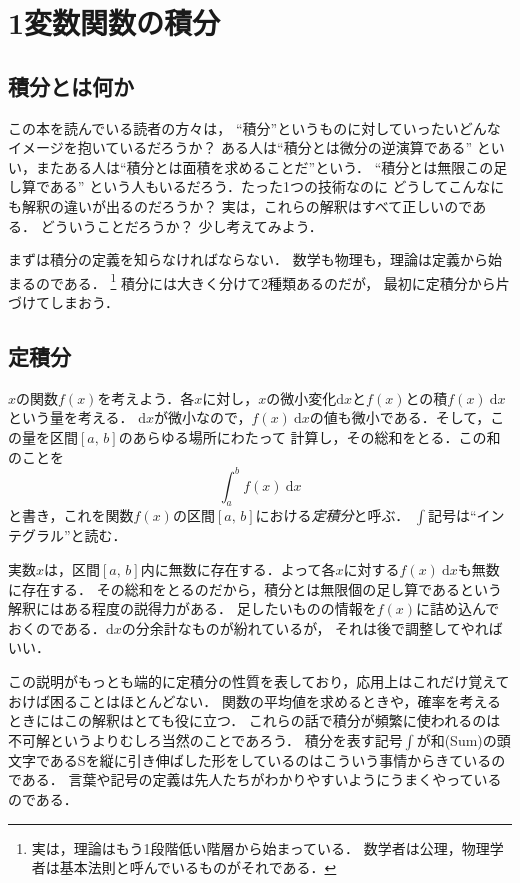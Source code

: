 \section{1変数関数の積分}
\subsection{積分とは何か}
この本を読んでいる読者の方々は，
``積分''というものに対していったいどんなイメージを抱いているだろうか？ ある人は``積分とは微分の逆演算である''
といい，またある人は``積分とは面積を求めることだ''という．
``積分とは無限この足し算である''
という人もいるだろう．たった1つの技術なのに
どうしてこんなにも解釈の違いが出るのだろうか？ 実は，これらの解釈はすべて正しいのである．
どういうことだろうか？ 少し考えてみよう．

まずは積分の定義を知らなければならない．
数学も物理も，理論は定義から始まるのである．
\footnote{実は，理論はもう1段階低い階層から始まっている．
数学者は公理，物理学者は基本法則と呼んでいるものがそれである．}
積分には大きく分けて2種類あるのだが，
最初に定積分から片づけてしまおう．

\subsection{定積分}
$x$の関数$f(x)$を考えよう．各$x$に対し，$x$の微小変化$\mathrm{d}x$と$f(x)$との積$f(x) \: \mathrm{d}x$という量を考える．
$\mathrm{d}x$が微小なので，$f(x) \: \mathrm{d}x$の値も微小である．そして，この量を区間$[a, \, b]$のあらゆる場所にわたって
計算し，その総和をとる．この和のことを
$$
\int_a^b f(x) \: \mathrm{d}x
$$
と書き，これを関数$f(x)$の区間$[a, \, b]$における\emph{定積分}と呼ぶ．
$\int$記号は``インテグラル''と読む．

実数$x$は，区間$[a, \, b]$内に無数に存在する．よって各$x$に対する$f(x) \: \mathrm{d}x$も無数に存在する．
その総和をとるのだから，積分とは無限個の足し算であるという解釈にはある程度の説得力がある．
足したいものの情報を$f(x)$に詰め込んでおくのである．$\mathrm{d}x$の分余計なものが紛れているが，
それは後で調整してやればいい．

この説明がもっとも端的に定積分の性質を表しており，応用上はこれだけ覚えておけば困ることはほとんどない．
関数の平均値を求めるときや，確率を考えるときにはこの解釈はとても役に立つ．
これらの話で積分が頻繁に使われるのは不可解というよりむしろ当然のことであろう．
積分を表す記号$\int$が和(Sum)の頭文字であるSを縦に引き伸ばした形をしているのはこういう事情からきているのである．
言葉や記号の定義は先人たちがわかりやすいようにうまくやっているのである．

